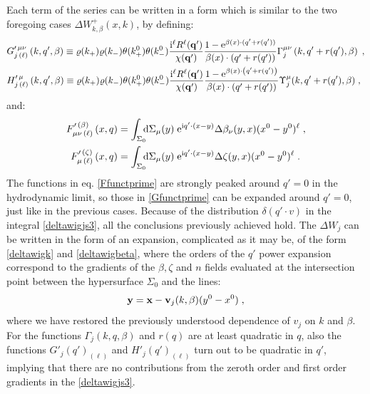 \documentclass[prd,superscriptaddress,nofootinbib,notitlepage]{revtex4-1}
\newcommand{\e}{{\rm e}}
\newcommand{\di}{{\rm d}}
\newcommand{\ii}{{\rm i}}
\newcommand{\q}{{\mathbf{q}}}
\newcommand{\x}{{\mathbf{x}}}
\newcommand{\y}{{\mathbf{y}}}
\begin{document}
%
Each term of the series can be written in a form which is similar to the two foregoing cases $\Delta W_{k,\beta}^+(x,k)$,
by defining:
%
\begin{subequations}\label{Gfunctprime}
 \begin{align}
     &  G^{\prime\,\mu\nu}_{j\,(\ell)}\left(k,q',\beta\right)\equiv \varrho(k_+)\varrho(k_-)\theta(k_+^0)\theta(k_-^0) 
 \frac{\ii^\ell R^\ell(\q')}{\chi(\q')}  \frac{1 -\e^{\beta(x)\cdot (q'+r(q'))}}{\beta(x) \cdot (q'+r(q'))} 
 \Gamma_{j}^{\mu\nu}\left(k,q'+r(q'),\beta\right)\;, \\
&  H_{j\,(\ell)}^{\prime\,\mu}\left(k,q',\beta\right) \equiv \varrho(k_+)\varrho(k_-)\theta(k_+^0)\theta(k_-^0) 
 \frac{\ii^\ell R^\ell(\q')}{\chi(\q')} \frac{1 -\e^{\beta(x)\cdot \left(q'+r(q')\right)}}{\beta(x) \cdot (q'+r(q'))} 
  \Upsilon_{j}^\mu(k,q'+r(q'),\beta)\;,
 \end{align}
\end{subequations}
%
and:
%
\begin{subequations}\label{Ffunctprime}
\begin{align}
    F^{\prime\,(\beta)}_{\mu\nu\,(\ell)}\left(x,q\right) &= \int_{\Sigma_{0}} \!\!\! \di \Sigma_{\mu}(y) \; 
  \e^{\ii q'\cdot(x-y)} \Delta \beta_\nu(y,x)(x^0-y^0)^\ell\;, \\
 F^{\prime\,(\zeta)}_{\mu\,(\ell)}\left(x,q\right)&= \int_{\Sigma_{0}} \!\!\! \di \Sigma_{\mu}(y) \; 
  \e^{\ii q' \cdot(x-y)} \Delta\zeta(y,x)(x^0-y^0)^\ell \;.
\end{align}
\end{subequations}
%
The functions in eq. \eqref{Ffunctprime} are strongly peaked around $q'=0$ in the hydrodynamic limit, so those
in \eqref{Gfunctprime} can be expanded around $q'=0$, just like in the previous cases. Because of the distribution 
$\delta(q' \cdot v)$ in the integral \eqref{deltawigjs3}, all the conclusions previously achieved hold. The 
$\Delta W_{j}$ can be written in the form of an expansion, complicated as it may be, of the form \eqref{deltawigk}
and \eqref{deltawigbeta}, where the orders of the $q'$ power expansion correspond to the gradients of the $\beta,\zeta$ 
and $n$ fields evaluated at the intersection point between the hypersurface $\Sigma_0$ and the lines:
%
$$
   \y = \x - {\bf v}_j(k,\beta) (y^0-x^0)\;,
$$
%
where we have restored the previously understood dependence of $v_j$ on $k$ and $\beta$. 
For the functions $\Gamma_{j}\left(k,q,\beta\right)$ and $r(q)$ are at least quadratic in $q$, also the functions 
$G'_{j}(q')_{(\ell)}$ and $H'_{j}(q')_{(\ell)}$ turn out to be quadratic in $q'$, implying that there are no contributions 
from the zeroth order and first order gradients in the \eqref{deltawigjs3}.
\end{document}
